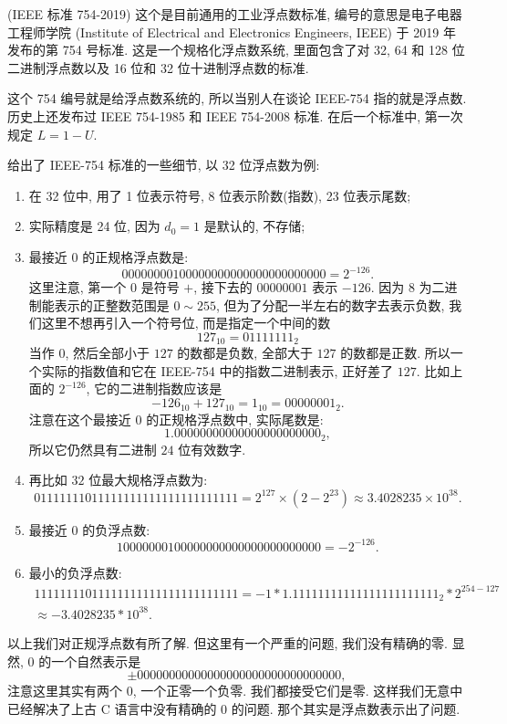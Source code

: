 \documentclass[a4paper]{ctexart}
\begin{document}
{ (IEEE 标准 754-2019) 这个是目前通用的工业浮点数标准,
编号的意思是电子电器工程师学院
(Institute of Electrical and Electronics Engineers, IEEE) 于 2019 年发布的第
754 号标准. 这是一个规格化浮点数系统, 里面包含了对 32, 64 和 128 位二进制浮点数以及
16 位和 32 位十进制浮点数的标准.

这个 754 编号就是给浮点数系统的, 所以当别人在谈论 IEEE-754 指的就是浮点数.
历史上还发布过 IEEE 754-1985 和 IEEE 754-2008 标准.
在后一个标准中, 第一次规定 $L = 1 - U$.

 给出了 IEEE-754 标准的一些细节, 以 32 位浮点数为例:
\begin{enumerate}
\item 在 32 位中, 用了 1 位表示符号, 8 位表示阶数(指数), 23 位表示尾数;
\item 实际精度是 24 位, 因为 $d_0 = 1$ 是默认的, 不存储;
\item 最接近 $0$ 的正规格浮点数是:
$$
0 00000001 00000000000000000000000 = 2^{-126}.
$$
这里注意, 第一个 $0$ 是符号 $+$, 接下去的 $00000001$ 表示 $-126$. 因为 $8$ 
为二进制能表示的正整数范围是 $0 \sim 255$, 但为了分配一半左右的数字去表示负数, 
我们这里不想再引入一个符号位, 而是指定一个中间的数 
$$
127_{10} = 01111111_{2}
$$
当作 $0$, 然后全部小于 $127$ 的数都是负数, 全部大于 $127$ 的数都是正数. 
所以一个实际的指数值和它在 IEEE-754 中的指数二进制表示, 正好差了 $127$. 
比如上面的 $2^{-126}$, 它的二进制指数应该是 
$$
-126_{10} + 127_{10} = 1_{10} = 00000001_{2}.
$$ 
注意在这个最接近 $0$ 的正规格浮点数中, 实际尾数是:
$$
1.00000000000000000000000_{2},
$$
所以它仍然具有二进制 $24$ 位有效数字.
\item 再比如 $32$ 位最大规格浮点数为:
$$
0 11111110 11111111111111111111111 = 2^{127} \times (2 - 2^{23}) \approx 
3.4028235 \times 10^{38}.
$$
\item 最接近 $0$ 的负浮点数:
$$
1 00000001 00000000000000000000000 = -2^{-126}.  
$$
\item 最小的负浮点数:
$$
\begin{array}{l}
1 11111110 11111111111111111111111 
= -1 * 1.11111111111111111111111_{2} * 2^{254-127} \\
\approx -3.4028235 * 10^{38}.
\end{array}
$$
\end{enumerate}
以上我们对正规浮点数有所了解. 但这里有一个严重的问题, 我们没有精确的零. 显然, $0$ 
的一个自然表示是
$$
\pm 0 00000000 00000000000000000000000,
$$
注意这里其实有两个 $0$, 一个正零一个负零. 我们都接受它们是零. 
这样我们无意中已经解决了上古 C 语言中没有精确的 $0$ 的问题. 那个其实是浮点数表示出了问题.
}
\end{document}
